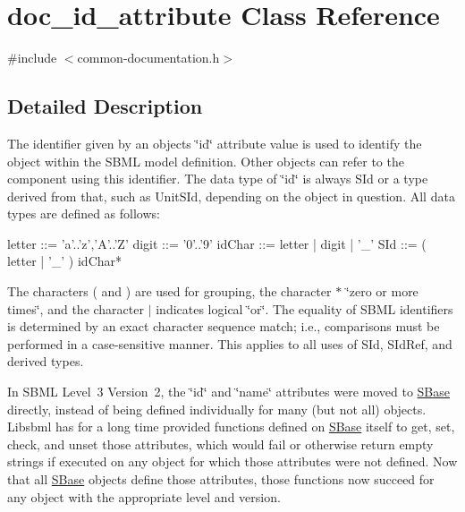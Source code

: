 \hypertarget{classdoc__id__attribute}{}\section{doc\+\_\+id\+\_\+attribute Class Reference}
\label{classdoc__id__attribute}


{\ttfamily \#include $<$common-\/documentation.\+h$>$}



\subsection{Detailed Description}
\begin{DoxyParagraph}{}
The identifier given by an object\textquotesingle{}s \char`\"{}id\char`\"{} attribute value is used to identify the object within the S\+B\+ML model definition. Other objects can refer to the component using this identifier. The data type of \char`\"{}id\char`\"{} is always {\ttfamily S\+Id} or a type derived from that, such as {\ttfamily Unit\+S\+Id}, depending on the object in question. All data types are defined as follows\+: 
\begin{DoxyPre}
     letter ::= 'a'..'z','A'..'Z'
     digit  ::= '0'..'9'
     idChar ::= letter | digit | '\_'
     SId    ::= ( letter | '\_' ) idChar*
   \end{DoxyPre}

\end{DoxyParagraph}
The characters {\ttfamily (} and {\ttfamily )} are used for grouping, the character {\ttfamily $\ast$} \char`\"{}zero or more times\char`\"{}, and the character {\ttfamily $\vert$} indicates logical \char`\"{}or\char`\"{}. The equality of S\+B\+ML identifiers is determined by an exact character sequence match; i.\+e., comparisons must be performed in a case-\/sensitive manner. This applies to all uses of {\ttfamily S\+Id}, {\ttfamily S\+Id\+Ref}, and derived types.

In S\+B\+ML Level~3 Version~2, the \char`\"{}id\char`\"{} and \char`\"{}name\char`\"{} attributes were moved to \hyperlink{class_s_base}{S\+Base} directly, instead of being defined individually for many (but not all) objects. Libsbml has for a long time provided functions defined on \hyperlink{class_s_base}{S\+Base} itself to get, set, check, and unset those attributes, which would fail or otherwise return empty strings if executed on any object for which those attributes were not defined. Now that all \hyperlink{class_s_base}{S\+Base} objects define those attributes, those functions now succeed for any object with the appropriate level and version.

